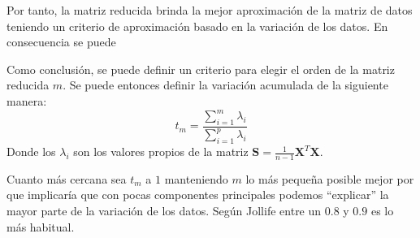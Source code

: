 \noindent Por tanto, la matriz reducida brinda la mejor aproximación de la matriz de datos teniendo un criterio de aproximación basado en la variación de los datos. En consecuencia se puede 

\noindent Como conclusión, se puede definir un criterio para elegir el orden de la matriz reducida $m$. Se puede entonces definir la variación acumulada de la siguiente manera:
\begin{equation}
t_m=\dfrac{\sum_{i=1}^{m}\lambda_i}{\sum_{i=1}^{p}\lambda_i}
\end{equation}
\noindent Donde los $\lambda_i$ son los valores propios de la matriz $\textbf{S}=\frac{1}{n-1}\textbf{X}^T\textbf{X}$.

\noindent Cuanto más cercana sea $t_m$ a $1$ manteniendo $m$ lo más pequeña posible mejor por que implicaría que con pocas componentes principales podemos ``explicar'' la mayor parte de la variación de los datos. Según Jollife \cite{Jollife 1986} entre un $0.8$ y $0.9$ es lo más habitual. 
